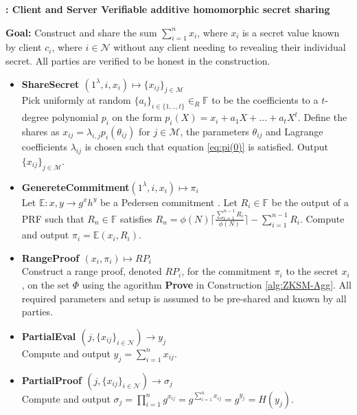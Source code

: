 \begin{algorithm}
\caption{\textbf{: Client and Server Verifiable additive homomorphic secret sharing}}

\textbf{Goal:} Construct and share the sum $\sum_{i=1}^n x_i$, where $x_i$ is a secret value known by client $c_i$, where $i\in\mathcal{N}$ without any client needing to revealing their individual secret. All parties are verified to be honest in the construction.
\vspace{2pt}
\hline
\vspace{2pt}
\begin{itemize}
 \item\textbf{ShareSecret $(1^\lambda,i,x_i) \mapsto \{x_{ij}\}_{j\in\mathcal{M}}$} \\
Pick uniformly at random $\{a_i\}_{i\in\{1,..,t\}}\in_R\mathds{F}$ to be the coefficients to a $t$-degree polynomial $p_i$ on the form $p_i(X) = x_i + a_1X+...+a_tX^t$. Define  the shares as $x_{ij}=\lambda_{i,j}p_i(\theta_{ij})$ for $j\in\mathcal{M}$, the parameters $\theta_{ij}$ and Lagrange coefficients $\lambda_{ij}$ is chosen such that equation \ref{eq:pi(0)} is satisfied.
Output $\{x_{ij}\}_{j\in\mathcal{M}}$.

\item\textbf{GenereteCommitment$(1^\lambda,i,x_i) \mapsto \pi_i$ }\\
Let $\mathds{E} : x,y \to g^xh^y$ be a Pedersen commitment . Let $R_i\in\mathds{F}$ be the output of a PRF such that $R_n\in \mathds{F}$  satisfies $R_n = \phi(N)\lceil \frac{\sum_{i=1}^{n-1}R_i}{\phi(N)}\rceil- \sum_{i=1}^{n-1}R_i $. Compute and output $\pi_i = \mathds{E}(x_i,R_i)$.

\item\textbf{RangeProof $(x_i,\pi_i) \mapsto RP_i$}\\
Construct a range proof, denoted $RP_i$, for the commitment $\pi_i$ to the secret $x_i$, on the set $\Phi$ using the agorithm \textbf{Prove} in Construction \ref{alg:ZKSM-Agg}. All required  parameters and setup is assumed to be pre-shared and known by all parties.

\item\textbf{PartialEval $(j,\{x_{ij}\}_{i\in\mathcal{N}})\xrightarrow[]{}y_j$}\\
Compute and output $y_j = \sum_{i=1}^n x_{ij}$.

\item\textbf{PartialProof $(j,\{x_{ij}\}_{i\in\mathcal{N}})\xrightarrow[]{}\sigma_j$}\\
Compute and output $\sigma_j = \prod_{i=1}^n g^{x_{ij}} =  g^{\sum_{i=1}^n x_{ij}}= g^{y_j}=H(y_j)$.


\end{itemize}
\end{algorithm}
